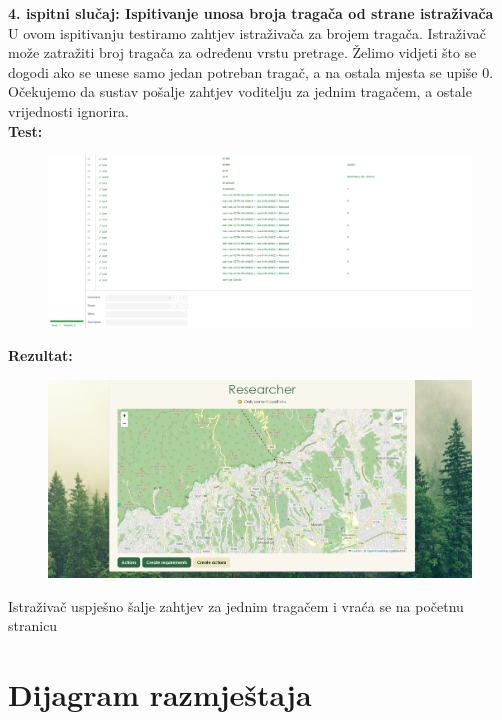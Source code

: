 \noindent \textbf{4. ispitni slučaj: Ispitivanje unosa broja tragača od strane istraživača}\\
U ovom ispitivanju testiramo zahtjev istraživača za brojem tragača. Istraživač može zatražiti broj tragača za određenu vrstu pretrage. Želimo vidjeti što se dogodi ako se unese samo jedan potreban tragač, a na ostala mjesta se upiše 0. Očekujemo da sustav pošalje zahtjev voditelju za jednim tragačem, a ostale vrijednosti ignorira. \\
\textbf{Test:}
\begin{figure}[H]
	\includegraphics[scale=0.4]{slike/test4sel.PNG} %
	\centering
\end{figure}
\noindent \textbf{Rezultat:}
\begin{figure}[H]
	\includegraphics[scale=0.4]{slike/seltestres2copy.PNG} %
	\centering
\end{figure}
\noindent Istraživač uspješno šalje zahtjev za jednim tragačem i vraća se na početnu stranicu \\

\eject 


\section{Dijagram razmještaja}

